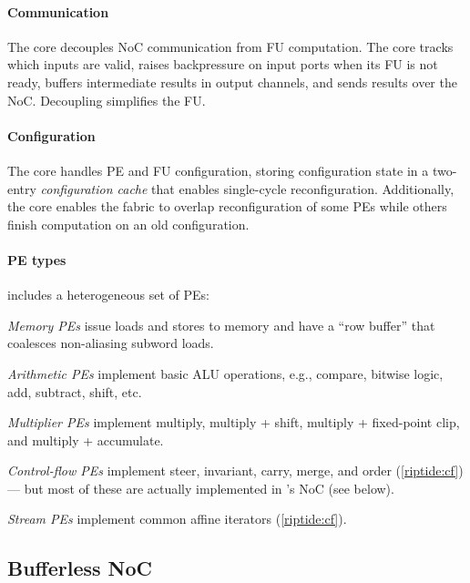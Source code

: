 \figRipTideArchPERouter

\paragraph{Communication}
The \textmu core decouples NoC communication from FU computation.
% 
The \textmu core tracks which inputs are valid, raises backpressure on
input ports when its FU is not ready, buffers intermediate results in
output channels, and sends results over the NoC.
%
Decoupling simplifies the FU.

\paragraph{Configuration}
The \textmu core handles PE and FU configuration, storing configuration state in a
two-entry {\em configuration cache} that enables single-cycle reconfiguration. 
% 
Additionally, the \textmu core enables the fabric to overlap
reconfiguration of some PEs while others
finish computation on an old configuration.

\paragraph{PE types}
\riptide includes a heterogeneous set of PEs:
\begin{compactitem}
\item \emph{Memory PEs} issue loads and stores to memory and have a ``row buffer'' that coalesces non-aliasing subword loads.

\item \emph{Arithmetic PEs} implement basic ALU operations, e.g., compare, bitwise logic, add, subtract, shift, etc.

\item \emph{Multiplier PEs} implement multiply, multiply + shift, multiply + fixed-point clip, and multiply + accumulate.

\item \emph{Control-flow PEs} implement steer, invariant, carry, %
  merge, and order (\autoref{riptide:cf}) ---
%
but most of these are actually implemented in \riptide's NoC (see below).

\item \emph{Stream PEs} implement common affine iterators (\autoref{riptide:cf}).
\end{compactitem}

\subsection{Bufferless NoC}
\label{arch:noc}

